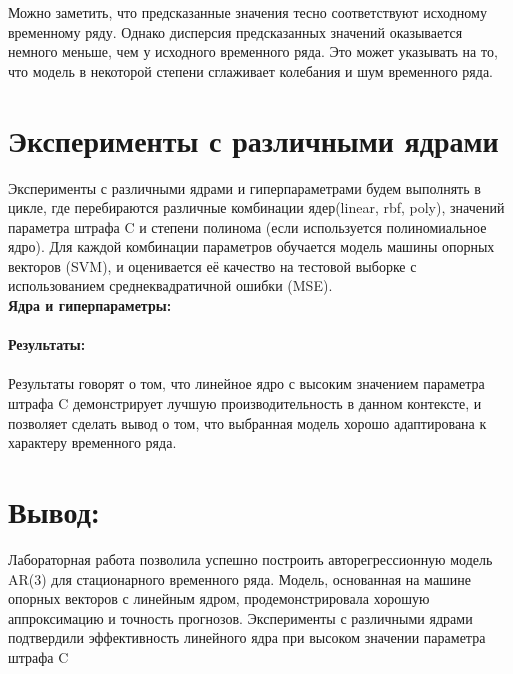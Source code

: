 \documentclass{article}
\begin{document}
Можно заметить, что предсказанные значения тесно соответствуют исходному временному ряду. Однако дисперсия предсказанных значений оказывается немного меньше, чем у исходного временного ряда. Это может указывать на то, что модель в некоторой степени сглаживает колебания и шум временного ряда.

\section{Эксперименты с различными ядрами}

Эксперименты с различными ядрами и гиперпараметрами будем выполнять в цикле, где перебираются различные комбинации ядер(linear, rbf, poly), значений параметра штрафа C и степени полинома (если используется полиномиальное ядро). Для каждой комбинации параметров обучается модель машины опорных векторов (SVM), и оценивается её качество на тестовой выборке с использованием среднеквадратичной ошибки (MSE).\\

\textbf{Ядра и гиперпараметры:}\\
\\

\textbf{Результаты:}\\
\\

Результаты говорят о том, что линейное ядро с высоким значением параметра штрафа C демонстрирует лучшую производительность в данном контексте, и позволяет сделать вывод о том, что выбранная модель хорошо адаптирована к характеру временного ряда.

\section{Вывод:}

Лабораторная работа позволила успешно построить авторегрессионную модель AR(3) для стационарного временного ряда. Модель, основанная на машине опорных векторов с линейным ядром, продемонстрировала хорошую аппроксимацию и точность прогнозов. Эксперименты с различными ядрами подтвердили эффективность линейного ядра при высоком значении параметра штрафа C
\end{document}
